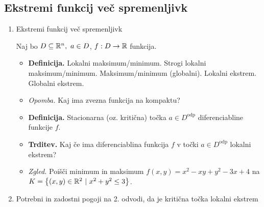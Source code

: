 \newpage
\subsection{Ekstremi funkcij več spremenljivk}
\begin{enumerate}
    \item Ekstremi funkcij več spremenljivk
    
    Naj bo $D \subseteq \mathbb{R}^n, \ a \in D$, $f: D \to \mathbb{R}$ funkcija.
    
    \begin{itemize}
        \item \colorbox{purple!30}{\textbf{Definicija.}} Lokalni maksimum/minimum. Strogi lokalni maksimum/minimum. Maksimum/minimum (globalni). Lokalni ekstrem. Globalni ekstrem.
        \item \colorbox{yellow!30}{\emph{Opomba.}} Kaj ima zvezna funkcija na kompaktu?
        \item \colorbox{purple!30}{\textbf{Definicija.}} Stacionarna (oz. kritična) točka $a \in D^\text{odp}$ diferenciabline funkcije $f$.
        \item \colorbox{blue!30}{\textbf{Trditev.}} Kaj če ima diferenciablina funkcija $f$ v točki $a \in D^\text{odp}$ lokalni ekstrem?
        \item \colorbox{yellow!30}{\emph{Zgled.}} Poišči minimum in maksimum $f(x,y) = x^2 - xy + y^2 -3x +4$ na $K = \left\{(x, y) \in \mathbb{R}^2 \ | \ x^2+y^2 \leq 3\right\}$.
    \end{itemize}    

    \item Potrebni in zadostni pogoji na 2. odvodi, da je kritična točka lokalni ekstrem
    

\end{enumerate}
